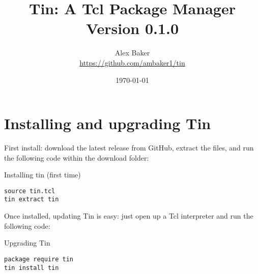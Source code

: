 \documentclass{article}
\title{\Huge Tin: A Tcl Package Manager\\\small Version 0.1.0}
\author{Alex Baker\\\small\hyperlink{https://github.com/ambaker1/tin}{https://github.com/ambaker1/tin}}
\date{\small\today}
\renewcommand{\^}[1]{\textsuperscript{#1}}
\renewcommand{\_}[1]{\textsubscript{#1}}
\begin{document}
\maketitle
\clearpage
\section{Installing and upgrading Tin}
First install: download the latest release from GitHub, extract the files, and run the following code within the download folder:
\begin{example}{Installing tin (first time)}
\begin{lstlisting}
source tin.tcl
tin extract tin
\end{lstlisting}
\end{example}
Once installed, updating Tin is easy: just open up a Tcl interpreter and run the following code:
\begin{example}{Upgrading Tin}
\begin{lstlisting}
package require tin
tin install tin
\end{lstlisting}
\end{example}
\clearpage
\end{document}
